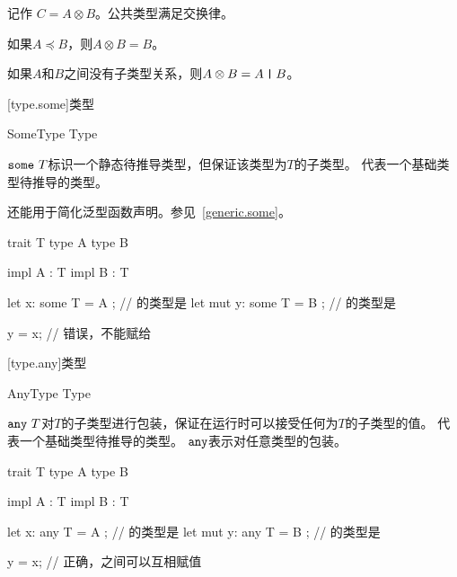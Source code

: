 记作 $C = A \otimes B$。公共类型满足交换律。

\pnum
如果$A \preceq B$，则$A \otimes B = B$。

\pnum
如果$A$和$B$之间没有子类型关系，则$A \otimes B = A \mathbin{\texttt{|}} B$。

[type.some]{类型}

\begin{bnf}{SomeType}
     Type \br
     \terminal{_}
\end{bnf}

\pnum
$\tcode{some}\ T$标识一个静态待推导类型，但保证该类型为$T$的子类型。
代表一个基础类型待推导的类型。

\pnum
{}还能用于简化泛型函数声明。参见~\ref{generic.some}。

\enterexample
\begin{codeblock}

trait T { }
type A { }
type B { }

impl A : T { }
impl B : T { }

let x: some T = A { }; // 的类型是
let mut y: some T = B { }; // 的类型是

y = x; // 错误，不能赋给

\end{codeblock}
\exitexample

[type.any]{类型}

\begin{bnf}{AnyType}
     Type \br
     \terminal{_} \br
\end{bnf}

\pnum
$\tcode{any}\ T$对$T$的子类型进行包装，保证在运行时可以接受任何为$T$的子类型的值。
代表一个基础类型待推导的类型。
$\texttt{any}$表示对任意类型的包装。

\enterexample
\begin{codeblock}

trait T { }
type A { }
type B { }

impl A : T { }
impl B : T { }

let x: any T = A { }; // 的类型是
let mut y: any T = B { }; // 的类型是

y = x; // 正确，之间可以互相赋值

\end{codeblock}
\exitexample

